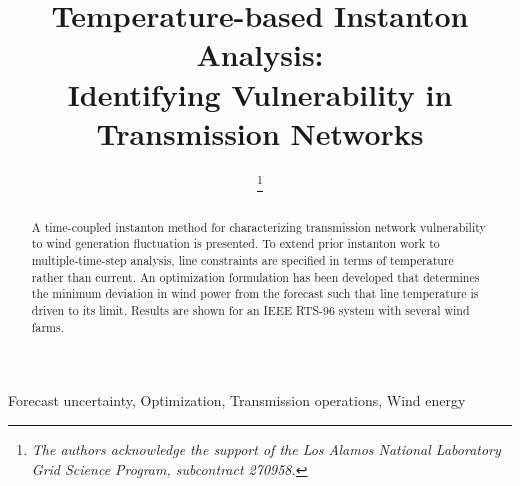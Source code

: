 \documentclass[conference]{IEEEtran}
\begin{document}
%
\title{Temperature-based Instanton Analysis: \\
Identifying Vulnerability in Transmission Networks}


\author{%

\and
{}

%

\thanks{\emph{The authors acknowledge the support of the Los Alamos National Laboratory Grid Science Program, subcontract 270958.}}%
}

\maketitle

\begin{abstract}
A time-coupled instanton method for characterizing transmission
network vulnerability to wind generation fluctuation is presented. To
extend prior instanton work to multiple-time-step analysis, line
constraints are specified in terms of temperature rather than
current. An optimization formulation has been developed that
determines the minimum deviation in wind power from the forecast such
that line temperature is driven to its limit. Results are shown for an
IEEE RTS-96 system with several wind farms.
\end{abstract}

\begin{IEEEkeywords}
Forecast uncertainty, Optimization, Transmission operations, Wind energy
\end{IEEEkeywords}
\end{document}
